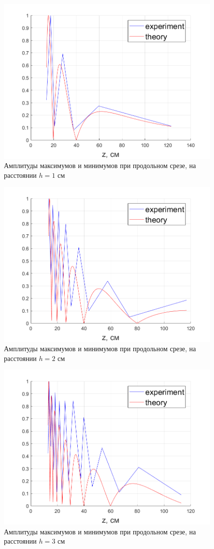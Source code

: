 \begin{figure}[H]
	\centering
	\includegraphics[width =0.75\linewidth]{pic/z2_1}
	\caption{Амплитуды максимумов и минимумов при продольном срезе, на расстоянии $h=1$ см}
	\label{fig:task21}
\end{figure}

\begin{figure}[H]
	\centering
	\includegraphics[width =0.75\linewidth]{pic/z2_2}
	\caption{Амплитуды максимумов и минимумов при продольном срезе, на расстоянии $h=2$ см}
	\label{fig:task22}
\end{figure}

\begin{figure}[H]
	\centering
	\includegraphics[width =0.75\linewidth]{pic/z2_3}
	\caption{Амплитуды максимумов и минимумов при продольном срезе, на расстоянии $h=3$ см}
	\label{fig:task23}
\end{figure}

